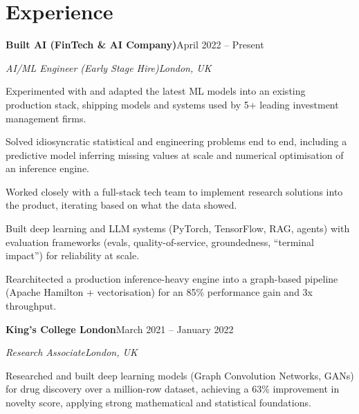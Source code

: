 \documentclass[10pt,a4paper]{article}
\newcommand{\entry}[4]{%
  {\color{company}\bfseries #1}\hfill {\color{muted}#2}\par
  \vspace{1pt}
  {\itshape #3}\hfill {\color{muted}\itshape #4}\par
  \vspace{3pt}%
}
\begin{document}
\section{Experience}
\entry{Built AI (FinTech \& AI Company)}{April 2022 -- Present}{AI/ML Engineer (Early Stage Hire)}{London, UK}
\begin{tight}
  \item Experimented with and adapted the latest ML models into an existing production stack, shipping models and systems used by 5+ leading investment management firms.
  \item Solved idiosyncratic statistical and engineering problems end to end, including a predictive model inferring missing values at scale and numerical optimisation of an inference engine.
  \item Worked closely with a full-stack tech team to implement research solutions into the product, iterating based on what the data showed.
  \item Built deep learning and LLM systems (PyTorch, TensorFlow, RAG, agents) with evaluation frameworks (evals, quality-of-service, groundedness, ``terminal impact'') for reliability at scale.
  \item Rearchitected a production inference-heavy engine into a graph-based pipeline (Apache Hamilton + vectorisation) for an 85\% performance gain and 3x throughput.
\end{tight}

\entry{King's College London}{March 2021 -- January 2022}{Research Associate}{London, UK}
\begin{tight}
  \item Researched and built deep learning models (Graph Convolution Networks, GANs) for drug discovery over a million-row dataset, achieving a 63\% improvement in novelty score, applying strong mathematical and statistical foundations.
\end{tight}

\end{document}

